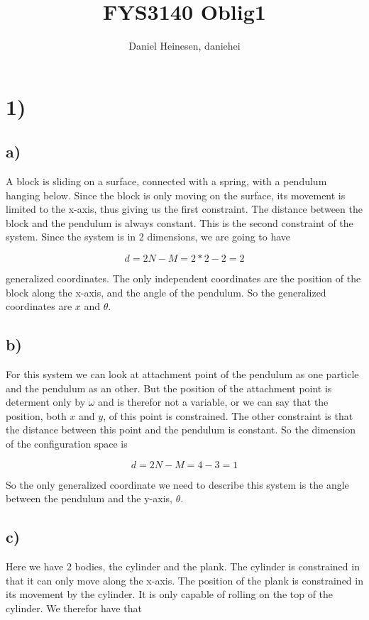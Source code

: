 \documentclass[a4paper,norsk, 10pt]{article}
\title{FYS3140 Oblig1}
\author{Daniel Heinesen, daniehei}
\begin{document}
\maketitle

\section*{1)}
\subsection*{a)}

A block is sliding on a surface, connected with a spring, with a pendulum hanging below. Since the block is only moving on the surface, its movement is limited to the x-axis, thus giving us the first constraint. The distance between the block and the pendulum is always constant. This is the second constraint of the system. Since the system is in 2 dimensions, we are going to have

$$
d = 2N - M = 2*2 -2 = 2
$$

generalized coordinates. The only independent coordinates are the position of the block along the x-axis, and the angle of the pendulum. So the generalized coordinates are $x$ and $\theta$.

\subsection*{b)}
For this system we can look at attachment point of the pendulum as one particle and the pendulum as an other. But the position of the attachment point is determent only by $\omega$ and is therefor not a variable, or we can say that the position, both $x$ and $y$, of this point is constrained. The other constraint is that the distance between this point and the pendulum is constant. So the dimension of the configuration space is

$$d = 2N -M = 4 - 3 = 1$$

So the only generalized coordinate we need to describe this system is the angle between the pendulum and the y-axis, $\theta$.

\subsection*{c)}

Here we have 2 bodies, the cylinder and the plank. The cylinder is constrained in that it can only move along the x-axis. The position of the plank is constrained in its movement by the cylinder. It is only capable of rolling on the top of the cylinder. We therefor have that
\end{document}
